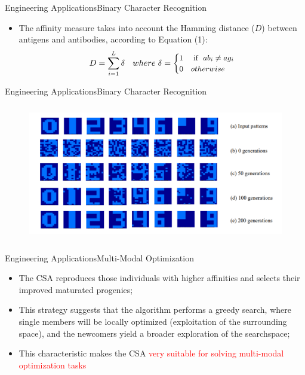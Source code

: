 \begin{frame}{Engineering Applications}{Binary Character Recognition}
\begin{itemize}
\item{The affinity measure takes into account the Hamming distance (\begin{math} D \end{math}) between antigens and antibodies, according to Equation (1):}
\begin{equation} \small{
 D =\sum_{i=1}^{L} \delta \quad where \  \delta = \begin{cases} 1 & \mbox{ if } \  ab_i \neq ag_i \\
 0  & otherwise \end{cases}}
 \end{equation}
\end{itemize}
\end{frame}

\begin{frame}{Engineering Applications}{Binary Character Recognition}
\begin{figure}[h]
\centering
\includegraphics[height=6cm]{img/cj_binary_pattern_learn.png}
\end{figure}
\end{frame}


\begin{frame}{Engineering Applications}{Multi-Modal Optimization}
\begin{itemize}
\item{The CSA reproduces those individuals with higher affinities and selects their improved maturated progenies;} 
\item{This strategy suggests that the algorithm performs a greedy search, where single members will be locally optimized (exploitation of the surrounding space), and the newcomers yield a broader exploration of the searchspace;}
\item{This characteristic makes the CSA \textcolor{red}{very suitable for solving multi-modal optimization tasks}}
\end{itemize}
\end{frame}

